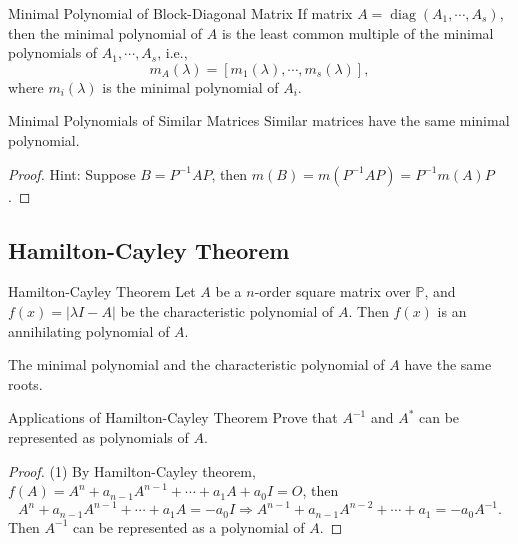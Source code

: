 \begin{proposition}{Minimal Polynomial of Block-Diagonal Matrix}{}
  If matrix $A = \operatorname{diag}(A_1,\cdots,A_s)$,
  then the minimal polynomial of $A$ is the least common multiple
  of the minimal polynomials of $A_1,\cdots,A_s$, i.e.,
  \begin{equation}
    m_A(\lambda) = [m_1(\lambda),\cdots,m_s(\lambda)],
  \end{equation}
  where $m_i(\lambda)$ is the minimal polynomial of $A_i$.
\end{proposition}

\begin{proposition}{Minimal Polynomials of Similar Matrices}{}
  Similar matrices have the same minimal polynomial.
\end{proposition}

\begin{proof}
  Hint: Suppose $B = P^{-1}AP$,
  then $m(B) = m(P^{-1}AP) = P^{-1}m(A)P$.
\end{proof}

\subsection{Hamilton-Cayley Theorem}

\begin{theorem}{Hamilton-Cayley Theorem}{}
  Let $A$ be a $n$-order square matrix over $\mathbb{P}$,
  and $f(x) = |\lambda I - A|$ be the characteristic polynomial of $A$.
  Then $f(x)$ is an annihilating polynomial of $A$.
\end{theorem}

\begin{corollary}{}{}
  The minimal polynomial and the characteristic polynomial of $A$ have the same roots.
\end{corollary}

\begin{example}{Applications of Hamilton-Cayley Theorem}{}
  Prove that $A^{-1}$ and $A^{\ast}$ can be represented as polynomials of $A$.
\end{example}

\begin{proof}
  (1) By Hamilton-Cayley theorem, $f(A) = A^n + a_{n-1}A^{n-1} + \cdots + a_1A + a_0I = O$, then
  \begin{equation}
    A^n + a_{n-1}A^{n-1} + \cdots + a_1A = -a_0 I \Rightarrow
    A^{n-1} +a_{n-1}A^{n-2} + \cdots + a_1 = -a_0A^{-1}.
  \end{equation}
  Then $A^{-1}$ can be represented as a polynomial of $A$.
\end{proof}




